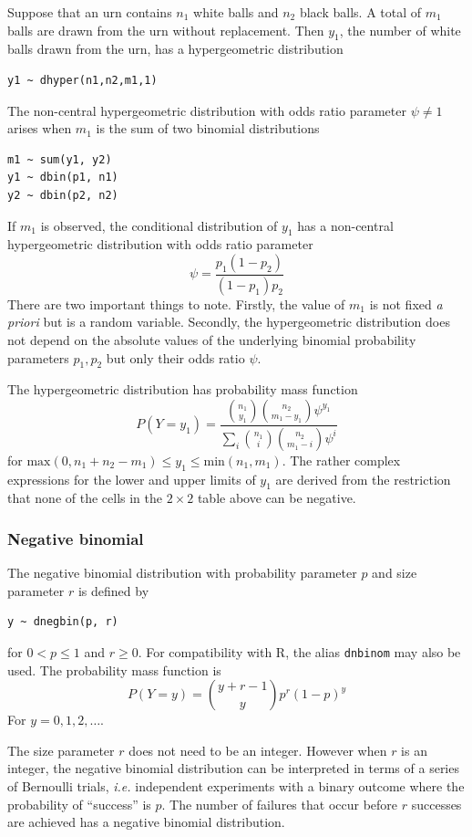 \documentclass[11pt, a4paper, titlepage]{report}
\begin{document}
Suppose that an urn contains $n_1$ white balls and $n_2$ black balls.
A total of $m_1$ balls are drawn from the urn without replacement.
Then $y_1$, the number of white balls drawn from the urn, has a
hypergeometric distribution
\begin{verbatim}
y1 ~ dhyper(n1,n2,m1,1)
\end{verbatim}

The non-central hypergeometric distribution with odds ratio parameter
$\psi \neq 1$ arises when $m_1$ is the sum of two binomial distributions
\begin{verbatim}
m1 ~ sum(y1, y2)
y1 ~ dbin(p1, n1)
y2 ~ dbin(p2, n2)
\end{verbatim}
If $m_1$ is observed, the conditional distribution of $y_1$ has a
non-central hypergeometric distribution with odds ratio parameter
\[
\psi = \frac{p_1 (1 - p_2)}{(1 - p_1) p_2}
\]
There are two important things to note. Firstly, the value of $m_1$ is
not fixed {\em a priori} but is a random variable. Secondly, the
hypergeometric distribution does not depend on the absolute values of
the underlying binomial probability parameters $p_1, p_2$ but only
their odds ratio $\psi$.

The hypergeometric distribution has probability mass function
\[
P(Y=y_1) = \frac{ {n_1 \choose y_1} {n_2 \choose m_1 - y_1} \psi^{y_1}}
{ \sum_i {n_1 \choose i} {n_2 \choose m_1 - i} \psi^i}
\]
for $\text{max}(0, n_1 + n_2 - m_1) \leq y_1 \leq
\text{min}(n_1,m_1)$.  The rather complex expressions for the lower
and upper limits of $y_1$ are derived from the restriction that none
of the cells in the $2 \times 2$ table above can be negative.

\subsubsection{Negative binomial}

The negative binomial distribution with probability parameter $p$
and size parameter $r$ is defined by
\begin{verbatim}
y ~ dnegbin(p, r)
\end{verbatim}
for $0 < p \leq 1$ and $r \geq 0$. For compatibility with R, the
alias \texttt{dnbinom} may also be used. The probability mass function is
\[
P(Y=y) = {y + r -1 \choose y} p^r (1-p)^y
\]
For $y = 0, 1, 2, \ldots$.

The size parameter $r$ does not need to be an integer. However when
$r$ is an integer, the negative binomial distribution can be
interpreted in terms of a series of Bernoulli trials, {\em i.e.}
independent experiments with a binary outcome where the probability of
``success'' is $p$. The number of failures that occur before $r$
successes are achieved has a negative binomial distribution.
\end{document}
